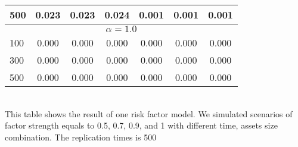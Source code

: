\begin{table}[!hbt]
\begin{tabular}{l|ccc|ccc}
		500                  & 0.023 &0.023  &0.024                &  0.001&0.001  &0.001     \\
		\hline
		\multicolumn{7}{c}{$\alpha = 1.0$}         \\
		\hline
		100                  & 0.000 & 0.000 & 0.000                & 0.000 & 0.000 & 0.000    \\
		300                  & 0.000 & 0.000 & 0.000                & 0.000 & 0.000 & 0.000    \\
		500                  & 0.000 & 0.000 & 0.000                & 0.000 & 0.000 & 0.000    \\
		\hline 
		\hline
	\end{tabular}
\bigskip\\
This table shows the result of one risk factor model.
We simulated scenarios of factor strength equals to 0.5, 0.7, 0.9, and 1 with different time, assets size combination. The replication times is 500
\end{table}


